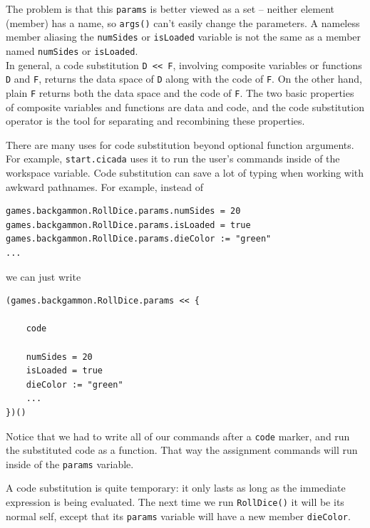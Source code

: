 \documentclass{article}
\newenvironment{code}{
       \begin{list}{}{
               \setlength{\leftmargin}{.4in}
               \setlength{\rightmargin}{0in}
               \setlength{\topsep}{.2in}
       }
       \small
       \item[] }
       { \end{list}   }
\begin{document}
\noindent The problem is that this \verb#params# is better viewed as a set -- neither element (member) has a name, so \verb#args()# can't easily change the parameters.  A nameless member aliasing the \verb#numSides# or \verb#isLoaded# variable is not the same as a member named \verb#numSides# or \verb#isLoaded#.\\


In general, a code substitution \verb#D << F#, involving composite variables or functions \verb#D# and \verb#F#, returns the data space of \verb#D# along with the code of \verb#F#.  On the other hand, plain \verb#F# returns both the data space and the code of \verb#F#.  The two basic properties of composite variables and functions are data and code, and the code substitution operator is the tool for separating and recombining these properties.

There are many uses for code substitution beyond optional function arguments.  For example, \verb#start.cicada# uses it to run the user's commands inside of the workspace variable.  Code substitution can save a lot of typing when working with awkward pathnames.  For example, instead of

\begin{code} \begin{verbatim}
games.backgammon.RollDice.params.numSides = 20
games.backgammon.RollDice.params.isLoaded = true
games.backgammon.RollDice.params.dieColor := "green"
...
\end{verbatim} \end{code}

\noindent we can just write

\begin{code} \begin{verbatim}
(games.backgammon.RollDice.params << {
    
    code
    
    numSides = 20
    isLoaded = true
    dieColor := "green"
    ...
})()
\end{verbatim} \end{code}

\noindent Notice that we had to write all of our commands after a \texttt{code} marker, and run the substituted code as a function.  That way the assignment commands will run inside of the \verb#params# variable.

A code substitution is quite temporary:  it only lasts as long as the immediate expression is being evaluated.  The next time we run \verb#RollDice()# it will be its normal self, except that its \verb#params# variable will have a new member \verb#dieColor#.
\end{document}
